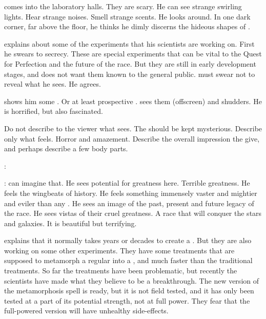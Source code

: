\Teshrial comes into the laboratory halls. 
They are scary.
He can see strange swirling lights.
Hear strange noises.
Smell strange scents. 
He looks around. 
In one dark corner, far above the floor, he thinks he dimly discerns the hideous shapes of \SitraAchra \screamers. 



\begin{comment}
  \subsection{Azraid tells about the weapon}
\end{comment}

\Azraid explains about some of the experiments that his scientists are working on. 
First he swears \Teshrial to secrecy.
These are special experiments that can be vital to the Quest for Perfection and the future of the \resphan race.
But they are still in early development stages, and \Azraid does not want them known to the general public. 
\Teshrial must swear not to reveal what he sees. 
He agrees. 

\Azraid shows him some \neoresphain. 
Or at least prospective \neoresphain. 
\Teshrial sees them (offscreen) and shudders. 
He is horrified, but also fascinated. 

Do not describe to the viewer what \Teshrial sees. 
The \neoresphain should be kept mysterious.
Describe only what \Teshrial feels. 
Horror and amazement.
Describe the overall impression the \neoresphain give, and perhaps describe a few body parts. 

\Azraid:

\Teshrial:
\Teshrial can imagine that. 
He sees potential for greatness here.
Terrible greatness. 
He feels the wingbeats of history.
He feels something immensely vaster and mightier and eviler than any \resphan.
He sees an image of the past, present and future legacy of the \resphan race.
He sees vistas of their cruel greatness.
A race that will conquer the stars and galaxies. 
It is beautiful but terrifying.

\Azraid explains that it normally takes years or decades to create a \neoresphan.
But they are also working on some other experiments.
They have some treatments that are supposed to metamorph a regular \resphan into a \neoresphan, and much faster than the traditional treatments. 
So far the treatments have been problematic, but recently the scientists have made what they believe to be a breakthrough.
The new version of the metamorphosis spell is ready, but it is not field tested, and it has only been tested at a part of its potential strength, not at full power. 
They fear that the full-powered version will have unhealthy side-effects. 

